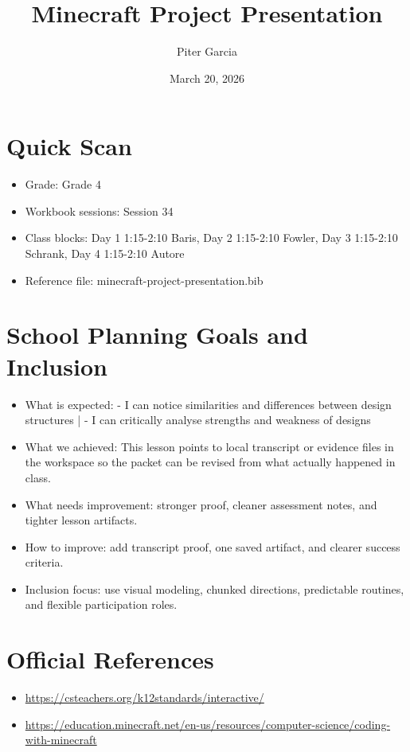 \documentclass[11pt]{article}
\title{Minecraft Project Presentation}
\author{Piter Garcia}
\date{March 20, 2026}
\begin{document}
    \maketitle
    \section*{Quick Scan}
    \begin{itemize}[leftmargin=*]
    \item Grade: Grade 4
    \item Workbook sessions: Session 34
    \item Class blocks: Day 1 1:15-2:10 Baris, Day 2 1:15-2:10 Fowler, Day 3 1:15-2:10 Schrank, Day 4 1:15-2:10 Autore
    \item Reference file: minecraft-project-presentation.bib
    \end{itemize}
    \section*{School Planning Goals and Inclusion}
    \begin{itemize}[leftmargin=*]
    \item What is expected: - I can notice similarities and differences between design structures | - I can critically analyse strengths and weakness of designs
    \item What we achieved: This lesson points to local transcript or evidence files in the workspace so the packet can be revised from what actually happened in class.
    \item What needs improvement: stronger proof, cleaner assessment notes, and tighter lesson artifacts.
    \item How to improve: add transcript proof, one saved artifact, and clearer success criteria.
    \item Inclusion focus: use visual modeling, chunked directions, predictable routines, and flexible participation roles.
    \end{itemize}
    \section*{Official References}
    \begin{itemize}[leftmargin=*]
    \item \url{https://csteachers.org/k12standards/interactive/}
\item \url{https://education.minecraft.net/en-us/resources/computer-science/coding-with-minecraft}

    \end{itemize}
    
\end{document}
